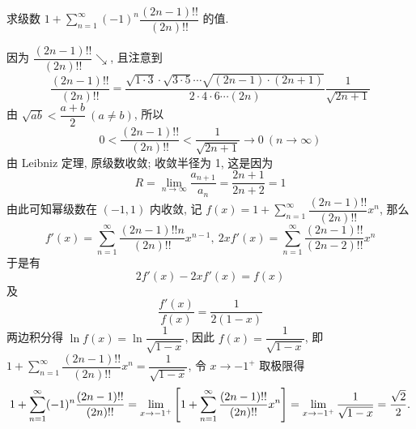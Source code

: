 \begin{example}
    求级数 $1+\displaystyle\sum_{n=1}^{\infty}(-1)^n\dfrac{(2n-1)!!}{(2n)!!}$ 的值.
\end{example}
\begin{solution}
    因为 $\dfrac{(2n-1)!!}{(2n)!!}\searrow$, 且注意到 $$\dfrac{(2n-1)!!}{(2n)!!}=\dfrac{\sqrt{1\cdot3}\cdot\sqrt{3\cdot5}\cdots\sqrt{(2n-1)\cdot(2n+1)}}{2\cdot4\cdot6\cdots (2n)}\dfrac{1}{\sqrt{2n+1}}$$
    由 $\sqrt{ab}<\dfrac{a+b}{2}~ (a\neq b)$, 所以
    $$0<\dfrac{(2n-1)!!}{(2n)!!}<\dfrac{1}{\sqrt{2n+1}}\to0~ (n\to\infty)$$
    由 Leibniz 定理, 原级数收敛;
    收敛半径为 1, 这是因为 $$R=\lim_{n\to\infty}\dfrac{a_{n+1}}{a_{n}}=\dfrac{2n+1}{2n+2}=1$$
    由此可知幂级数在 $(-1,1)$ 内收敛, 记 $\displaystyle f(x)=1+\sum_{n=1}^{\infty}\dfrac{(2n-1)!!}{(2n)!!}x^n$, 那么
    $$f'(x)=\sum_{n=1}^{\infty}\dfrac{(2n-1)!!n}{(2n)!!}x^{n-1},~2xf'(x)=\sum_{n=1}^{\infty}\dfrac{(2n-1)!!}{(2n-2)!!}x^n$$
    于是有 $$2f'(x)-2xf'(x)=f(x)$$
    及 $$\dfrac{f'(x)}{f(x)}=\dfrac{1}{2(1-x)}$$
    两边积分得 $\ln f(x)=\ln\dfrac{1}{\sqrt{1-x}}$, 因此 $f(x)=\dfrac{1}{\sqrt{1-x}}$, 即 $\displaystyle 1+\sum_{n=1}^{\infty}\dfrac{(2n-1)!!}{(2n)!!}x^n=\dfrac{1}{\sqrt{1-x}}$, 
    令 $x\to -1^+$ 取极限得
    $$1+\sum_{n=1}^{\infty}(-1)^n\dfrac{(2n-1)!!}{(2n)!!}=\lim_{x\to-1^+}\qty[1+\sum_{n=1}^{\infty}\dfrac{(2n-1)!!}{(2n)!!}x^n]=\lim_{x\to-1^+}\dfrac{1}{\sqrt{1-x}}=\dfrac{\sqrt{2}}{2}.$$
\end{solution}

